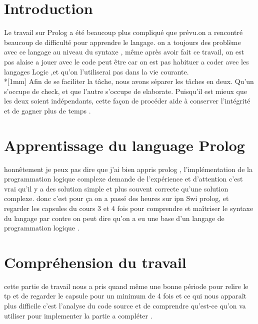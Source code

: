 \documentclass[12pt, letterpaper]{article}
\begin{document}
\par{
\section{Introduction}
Le travail sur Prolog a été beaucoup plus compliqué que prévu.on a rencontré beaucoup de difficulté pour apprendre le langage. on a toujours des problème avec ce langage au niveau du syntaxe , même après avoir fait ce travail, on est pas alaise a jouer avec le code peut être car on est pas habituer a coder avec les langages Logic ,et  qu'on l'utiliserai pas dans la vie courante. \\*[1mm]
Afin de se faciliter la tâche, nous avons séparer les tâches en deux. Qu'un s'occupe de check, et que l'autre s'occupe de elaborate. Puisqu'il est mieux que les deux soient indépendants, cette façon de procéder aide à conserver l'intégrité et de gagner plus de temps .
\section {Apprentissage du language Prolog}
honnêtement je peux pas dire que j'ai bien appris prolog , l'implémentation de la programmation logique complexe demande de l'expérience et d'attention c'est vrai qu'il y a des solution simple et plus souvent correcte qu’une solution complexe. donc c'est pour ça on a passé des heures sur ipn Swi prolog, et regarder les capsules du cours 3 et 4 fois pour comprendre et maîtriser le syntaxe du langage par contre on peut dire qu'on a eu une base d'un langage de programmation logique .
\section {Compréhension du travail}
cette partie de travail nous a pris quand même une bonne période pour relire le tp et de regarder le capsule pour un minimum de 4 fois et ce qui nous apparaît plus difficile c'est l'analyse du code source et de comprendre qu'est-ce qu'on va utiliser pour implementer la partie a compléter .
}
\end{document}
